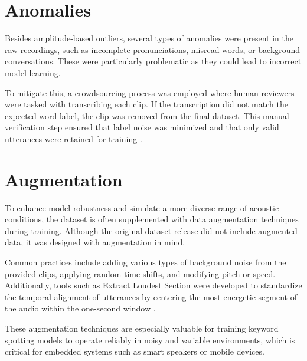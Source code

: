 \section{Anomalies}

Besides amplitude-based outliers, several types of anomalies were present in the raw recordings, such as incomplete pronunciations, misread words, or background conversations. These were particularly problematic as they could lead to incorrect model learning.

\bigskip

To mitigate this, a crowdsourcing process was employed where human reviewers were tasked with transcribing each clip. If the transcription did not match the expected word label, the clip was removed from the final dataset. This manual verification step ensured that label noise was minimized and that only valid utterances were retained for training \cite{Warden:2020}.

\section{Augmentation}

To enhance model robustness and simulate a more diverse range of acoustic conditions, the dataset is often supplemented with data augmentation techniques during training. Although the original dataset release did not include augmented data, it was designed with augmentation in mind.

\bigskip

Common practices include adding various types of background noise from the provided clips, applying random time shifts, and modifying pitch or speed. Additionally, tools such as Extract Loudest Section were developed to standardize the temporal alignment of utterances by centering the most energetic segment of the audio within the one-second window \cite{Warden:2020}.

\bigskip

These augmentation techniques are especially valuable for training keyword spotting models to operate reliably in noisy and variable environments, which is critical for embedded systems such as smart speakers or mobile devices.

